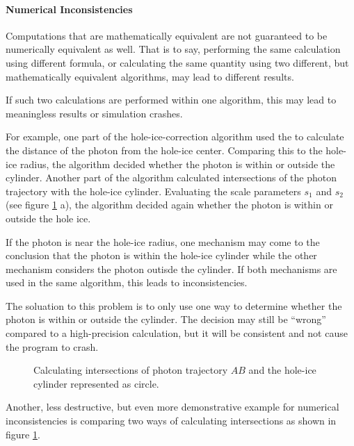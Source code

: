 \paragraph{Numerical Inconsistencies}
Computations that are mathematically equivalent are not guaranteed to be numerically equivalent as well. That is to say, performing the same calculation using different formula, or calculating the same quantity using two different, but mathematically equivalent algorithms, may lead to different results.

If such two calculations are performed within one algorithm, this may lead to meaningless results or simulation crashes.

For example, one part of the hole-ice-correction algorithm used the  to calculate the distance of the photon from the hole-ice center. Comparing this to the hole-ice radius, the algorithm decided whether the photon is within or outside the cylinder. Another part of the algorithm calculated intersections of the photon trajectory with the hole-ice cylinder. Evaluating the scale parameters $s_1$ and $s_2$ (see figure \ref{fig:aeQuae2U} a), the algorithm decided again whether the photon is within or outside the hole ice.

If the photon is near the hole-ice radius, one mechanism may come to the conclusion that the photon is within the hole-ice cylinder while the other mechanism considers the photon outisde the cylinder. If both mechanisms are used in the same algorithm, this leads to inconsistencies.

The soluation to this problem is to only use one way to determine whether the photon is within or outside the cylinder. The decision may still be ``wrong'' compared to a high-precision calculation, but it will be consistent and not cause the program to crash.

\begin{figure}[htbp]
  \caption{Calculating intersections of photon trajectory $AB$ and the hole-ice cylinder represented as circle.}
  \label{fig:aeQuae2U}
\end{figure}


Another, less destructive, but even more demonstrative example for numerical inconsistencies is comparing two ways of calculating intersections as shown in figure \ref{fig:aeQuae2U}.

